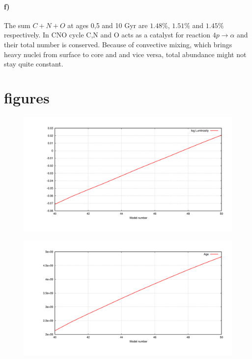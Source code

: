 \documentclass[12pt]{article}
\begin{document}
\paragraph{f)}
The sum $C+N+O$ at ages 0,5 and 10 Gyr are $1.48\%$, $1.51\%$ and $1.45\%$ respectively. In CNO cycle C,N and O acts as a catalyst for reaction $4p\longrightarrow\alpha$ and their total number is conserved. Because of convective mixing, which brings heavy nuclei from surface to core and and vice versa, total abundance might not stay quite constant.
 
\newpage

\section{figures}

\begin{figure}[!ht]
\begin{center}
\includegraphics[width=1.0\textwidth]{ex_1_3_a1.png}
\end{center}
\vspace*{-10mm}
\caption{}
\label{fig:ex_1.3_a1}
\end{figure}

\begin{figure}[!ht]
\begin{center}
\includegraphics[width=1.0\textwidth]{ex_1_3_a2.png}
\end{center}
\vspace*{-10mm}
\caption{}
\label{fig:ex_1.3_a2}
\end{figure}
\end{document}
